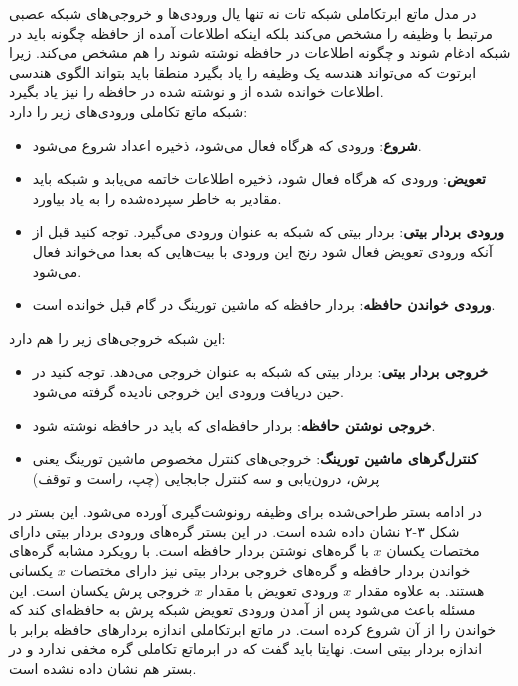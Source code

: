 در مدل ماتع ابرتکاملی شبکه تات نه تنها یال ورودی‌ها و خروجی‌های شبکه عصبی مرتبط با وظیفه را مشخص می‌کند بلکه اینکه اطلاعات آمده از حافظه چگونه باید در شبکه ادغام شوند و چگونه اطلاعات در حافظه نوشته شوند را هم مشخص می‌کند. زیرا ابرتوت که می‌تواند هندسه یک وظیفه را یاد بگیرد منطقا باید بتواند الگوی هندسی اطلاعات خوانده شده از و نوشته شده در حافظه را نیز یاد بگیرد.\cite{merrild2018hyperntm}
\\

شبکه ماتع تکاملی ورودی‌های زیر را دارد:
\begin{itemize}
\item \textbf{شروع}: ورودی که هرگاه فعال می‌شود، ذخیره اعداد شروع می‌شود.
\item \textbf{تعویض}: ورودی که هرگاه فعال شود، ذخیره اطلاعات خاتمه می‌یابد و شبکه باید مقادیر به خاطر سپرده‌شده را به یاد بیاورد.
\item \textbf{ورودی بردار بیتی}: بردار بیتی که شبکه به عنوان ورودی می‌گیرد. توجه کنید قبل از آنکه ورودی تعویض فعال شود رنج این ورودی با بیت‌هایی که بعدا می‌خواند فعال می‌شود.
\item \textbf{ورودی خواندن حافظه}: بردار حافظه که ماشین تورینگ در گام قبل خوانده است.\cite{merrild2018hyperntm}
\end{itemize}

این شبکه خروجی‌های زیر را هم دارد:
\begin{itemize}
\item \textbf{خروجی بردار بیتی}: بردار بیتی که شبکه به عنوان خروجی می‌دهد. توجه کنید در حین دریافت ورودی این خروجی نادیده گرفته می‌شود.
\item \textbf{خروجی نوشتن حافظه}: بردار حافظه‌ای که باید در حافظه نوشته شود.
\item \textbf{کنترل‌گر‌های ماشین تورینگ}: خروجی‌های کنترل مخصوص ماشین تورینگ یعنی پرش، درون‌یابی و سه کنترل جابجایی (چپ، راست و توقف)\cite{merrild2018hyperntm} 
\end{itemize}

در ادامه بستر طراحی‌شده برای وظیفه رونوشت‌گیری آورده می‌شود. این بستر در شکل ۳-۲ نشان داده شده است. در این بستر گره‌های ورودی بردار بیتی دارای مختصات یکسان $x$ با گره‌های نوشتن بردار حافظه است. با رویکرد مشابه گره‌های خواندن بردار حافظه و گره‌های خروجی بردار بیتی نیز دارای مختصات $x$ یکسانی هستند.
به علاوه مقدار $x$ ورودی تعویض با مقدار $x$ خروجی پرش یکسان است. این مسئله باعث می‌شود پس از آمدن ورودی تعویض شبکه پرش به حافظه‌ای کند که خواندن را از آن شروع کرده است. در ماتع ابرتکاملی اندازه بردارهای حافظه برابر با اندازه بردار بیتی است. نهایتا باید گفت که در ابرماتع تکاملی گره مخفی ندارد و در بستر هم نشان داده نشده است.\cite{merrild2018hyperntm}

